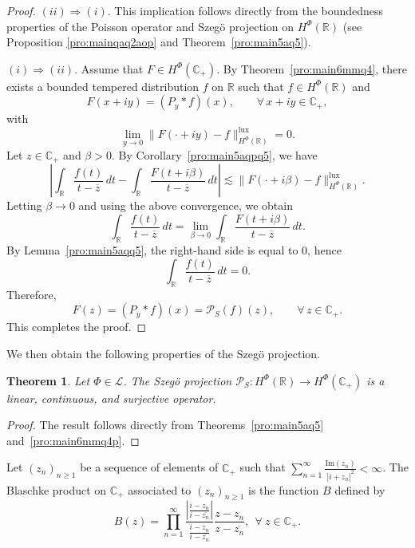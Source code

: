 \documentclass[a4paper,12pt,intlimits,oneside]{amsart}
\newtheorem{theorem}{Theorem}[section]
\theoremstyle{definition}
\numberwithin{equation}{section}
\theoremstyle{definition}
\begin{document}
\begin{proof}
\noindent
$(ii)\Rightarrow(i)$. 
This implication follows directly from the boundedness properties of the Poisson operator and Szeg\"o projection  on $H^{\Phi}(\mathbb{R})$ (see Proposition \ref{pro:mainqaq2aop} and  Theorem~\ref{pro:main5aq5}).

\medskip

\noindent
$(i)\Rightarrow(ii)$. 
Assume that $F \in H^{\Phi}(\mathbb{C}_{+})$. By Theorem~\ref{pro:main6mmq4}, there exists a bounded tempered distribution $f$ on $\mathbb{R}$ such that $f \in H^{\Phi}(\mathbb{R})$ and
\[
F(x+iy)=(P_{y}\ast f)(x), \qquad \forall\, x+iy \in \mathbb{C}_{+},
\]
with
\[
\lim_{y\to 0}\|F(\cdot+iy)-f\|_{H^{\Phi}(\mathbb{R})}^{\mathrm{lux}}=0.
\]
Let $z \in \mathbb{C}_{+}$ and $\beta>0$. By Corollary~\ref{pro:main5aqpq5}, we have
\[
\left|\int_{\mathbb{R}}\frac{f(t)}{t-\overline{z}}\,dt
-
\int_{\mathbb{R}}\frac{F(t+i\beta)}{t-\overline{z}}\,dt\right|
\lesssim \|F(\cdot+i\beta)-f\|_{H^{\Phi}(\mathbb{R})}^{\mathrm{lux}}.
\]
Letting $\beta \to 0$ and using the above convergence, we obtain
\[
\int_{\mathbb{R}}\frac{f(t)}{t-\overline{z}}\,dt
=
\lim_{\beta \to 0}\int_{\mathbb{R}}\frac{F(t+i\beta)}{t-\overline{z}}\,dt.
\]
By Lemma~\ref{pro:main5aqq5}, the right-hand side is equal to $0$, hence
\[
\int_{\mathbb{R}}\frac{f(t)}{t-\overline{z}}\,dt = 0.
\]
Therefore, 
\[
F(z)= (P_{y} \ast f)(x)= \mathcal{P}_{S}(f)(z), \qquad \forall\, z \in \mathbb{C}_{+}.
\]
This completes the proof.
\end{proof}


We then obtain the following properties of the Szeg\"o projection.
\begin{theorem}\label{pro:main2aaqaqop}
Let $\Phi \in \mathscr{L}$. The Szeg\"o projection 
$\mathcal{P}_{S}: H^{\Phi}(\mathbb{R}) \longrightarrow H^{\Phi}(\mathbb{C}_{+})$ is a linear, continuous, and surjective operator.
\end{theorem}

\begin{proof}
The result follows directly from Theorems~\ref{pro:main5aq5} and~\ref{pro:main6mmq4p}.
\end{proof}


Let $(z_{n})_{n\geq 1}$ be a sequence of elements of 
 $\mathbb{C}_{+}$ such that  $ \sum_{n=1}^{\infty}\frac{\mathrm{Im}( z_{n})}{|i+z_{n}|^{2}}< \infty$. The Blaschke product on $\mathbb{C}_{+}$ associated to $(z_{n})_{n\geq 1}$ is the function $B$ defined by
\begin{equation}\label{eq:phipaqm6e}
B(z)=\prod_{n=1}^{\infty}\dfrac{|\frac{i-z_{n}}{i-\overline{z_{n}}}|}{\frac{i -z_{n}}{i-\overline{z_{n}}}}\frac{z-z_{n}}{z-\overline{z_{n}}}, ~~\forall~
z \in \mathbb{C}_{+}.
\end{equation}
\end{document}
